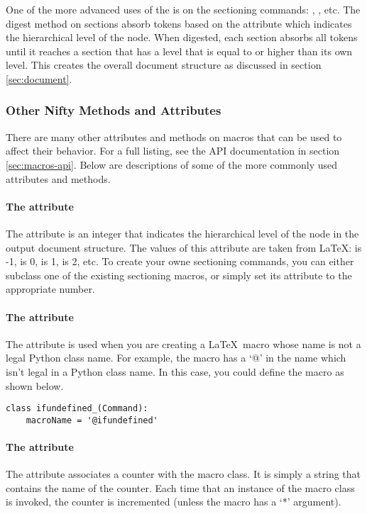 One of the more advanced uses of the  is on the sectioning
commands: , , etc.  The digest method
on sections absorb tokens based on the  attribute which
indicates the hierarchical level of the node.  When digested, each section
absorbs all tokens until it reaches a section that has a level that is
equal to or higher than its own level.  This creates the overall
document structure as discussed in section \ref{sec:document}.


\subsubsection{Other Nifty Methods and Attributes}

There are many other attributes and methods on macros that can be used
to affect their behavior.  For a full listing, see the API documentation
in section \ref{sec:macros-api}.  Below are descriptions of some of the
more commonly used attributes and methods.

\paragraph{The  attribute}
The  attribute is an integer that indicates the
hierarchical level of the node in the output document structure.
The values of this attribute are taken from \LaTeX: 
is -1,  is 0,  is 1, 
is 2, etc.  To create your owne sectioning commands, you can either
subclass one of the existing sectioning macros, or simply set its
 attribute to the appropriate number.

\paragraph{The  attribute}
The  attribute is used when you are creating a
\LaTeX\ macro whose name is not a legal Python class name.
For example, the macro  has a `@' in the name
which isn't legal in a Python class name.  In this case, you could define
the macro as shown below.
\begin{verbatim}
class ifundefined_(Command):
    macroName = '@ifundefined'
\end{verbatim}

\paragraph{The  attribute}
The  attribute associates a counter with the macro
class.  It is simply a string that contains the name of the counter.
Each time that an instance of the macro class is invoked, the
counter is incremented (unless the macro has a `*' argument).

